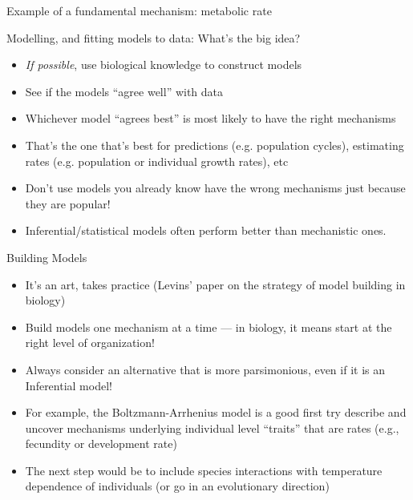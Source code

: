 \documentclass[xcolor=x11names,compress]{beamer}
\renewcommand{\(}{\begin{columns}}
\renewcommand{\)}{\end{columns}}
\newcommand{\<}[1]{\begin{column}{#1}}
\renewcommand{\>}{\end{column}}
\begin{document}
\begin{frame}{Example of a fundamental mechanism: metabolic rate}
\begin{itemize}
\end{itemize}
 
\end{frame}

\begin{frame}{Modelling, and fitting models to data: What's the big idea?}

\begin{itemize} [<+->] \itemsep8pt

	\item {\it If possible}, use biological knowledge to construct models
	\item See if the models ``agree well'' with data
	\item Whichever model ``agrees best'' is most likely to have the right 
	mechanisms
	\item That's the one that's best for predictions (e.g. population 
	cycles), estimating rates (e.g. population or individual growth rates), etc
	\item Don't use models you already know have the wrong mechanisms just because they are popular!
	\item Inferential/statistical models often perform better than mechanistic ones.    

\end{itemize}
  
\end{frame}


\begin{frame}{Building Models}

\begin{itemize}\itemsep10pt

	\item It's an art, takes practice (Levins' paper on the  strategy of model building in biology)
	
	\item Build models one mechanism at a time --- in biology, it means 
	start at the right level of organization! 
	
	\item Always consider an alternative that is more parsimonious, even if 
	it is an Inferential model! 

	\item For example, the Boltzmann-Arrhenius model is a good first try 
	describe and uncover mechanisms underlying individual level ``traits'' that are rates (e.g., fecundity or development rate)  

	\item The next step would be to include species interactions with  
	temperature dependence of individuals (or go in an evolutionary direction)

\end{itemize}   

\end{frame}
\end{document}
